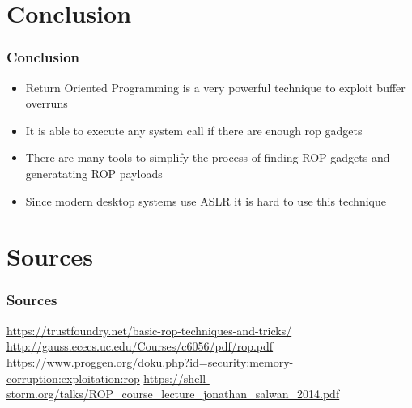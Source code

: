 \documentclass[11pt]{beamer}
\begin{document}
\section{Conclusion}
\begin{frame}
    \frametitle{Conclusion}
    \begin{itemize}
        \item Return Oriented Programming is a very powerful technique to exploit buffer overruns
        \item It is able to execute any system call if there are enough rop gadgets
        \item There are many tools to simplify the process of finding ROP gadgets and generatating ROP payloads
        \item Since modern desktop systems use ASLR it is hard to use this technique
    \end{itemize}
\end{frame}

\section{Sources}
\begin{frame}
    \frametitle{Sources}
    \url{https://trustfoundry.net/basic-rop-techniques-and-tricks/}
    \url{http://gauss.ececs.uc.edu/Courses/c6056/pdf/rop.pdf}
    \url{https://www.proggen.org/doku.php?id=security:memory-corruption:exploitation:rop}
    \url{https://shell-storm.org/talks/ROP_course_lecture_jonathan_salwan_2014.pdf}
\end{frame}
\end{document}
